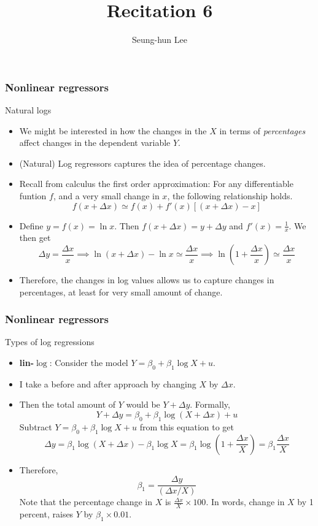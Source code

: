 \documentclass[compress]{beamer}
\title[Recitation 6]{Recitation 6} %
\author[Seung-hun Lee]{Seung-hun Lee}
\institute[Columbia University]{Columbia University}
\date[]{}
\begin{document}
\begin{frame}
\titlepage
\end{frame}



\begin{frame}
\frametitle{Nonlinear regressors}
Natural logs
\begin{itemize}
\item We might be interested in how the changes in the $X$ in terms of \textit{percentages} affect changes in the dependent variable $Y$. 
\item (Natural) Log regressors captures the idea of percentage changes. 
\item Recall from calculus the first order approximation: For any differentiable funtion $f$, and a very small change in $x$, the following relationship holds. 
\[
f(x+\Delta x) \simeq f(x)+f'(x)[(x+\Delta x) -x] 
\]
\item Define $y=f(x)=\ln{x}$. Then $f(x+\Delta x) = y+\Delta y$ and $f'(x)=\frac{1}{x}$. We then get 
\[
\Delta y = \frac{\Delta x}{x}\implies \ln{(x+\Delta x)}-\ln{x} \simeq \frac{\Delta x}{x} \implies \ln\left(1+\frac{\Delta x}{x}\right)\simeq\frac{\Delta x}{x}
\]
\item Therefore, the changes in log values allows us to capture changes in percentages, at least for very small amount of change.
\end{itemize}
\end{frame}

\begin{frame}
\frametitle{Nonlinear regressors}
Types of log regressions
\begin{itemize}
\item\textbf{lin-$\log$}:  Consider the model $Y=\beta_0 + \beta_1 \log{X}+u$.
\item I take a before and after approach by changing $X$ by $\Delta x$. 
\item Then the total amount of $Y$ would be $Y+\Delta y$. Formally, 
\[
Y+\Delta y = \beta_0 + \beta_1 \log(X+\Delta x)+u
\]
Subtract $Y=\beta_0 + \beta_1 \log{X}+u$ from this equation to get
\[
\Delta y = \beta_1 \log(X+\Delta x)-\beta_1\log{X} = \beta_1 \log\left(1+\frac{\Delta x}{X} \right) = \beta_1 \frac{\Delta x}{X}
\]
\item Therefore, 
\[
\beta_1 = \frac{\Delta y}{(\Delta x/X)}
\]
Note that the percentage change in $X$ is $\frac{\Delta x}{X} \times 100$. In words, change in $X$ by 1 percent, raises $Y$ by $\beta_1 \times 0.01$. 
\end{itemize}
\end{frame}
\end{document}

